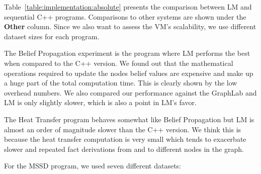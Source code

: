 Table~\ref{table:implementation:absolute} presents the comparison between LM and
sequential C++ programs. Comparisons to other systems are shown under the
\textbf{Other} column. Since we also want to assess the VM's scalability, we use
different dataset sizes for each program.

\begin{table}[ht]
   \begin{center}
      
   \end{center}


   \label{table:implementation:absolute}
\end{table}

The Belief Propagation experiment is the program where LM performs the best when
compared to the C++ version. We found out that the mathematical operations
required to update the nodes belief values are expensive and make up a huge part
of the total computation time. This is clearly shown by the low overhead
numbers. We also compared our performance against the GraphLab and LM is only
slightly slower, which is also a point in LM's favor.

The Heat Transfer program behaves somewhat like Belief Propagation but LM is
almost an order of magnitude slower than the C++ version. We think this is
because the heat transfer computation is very small which tends to exacerbate
slower and repeated fact derivations from and to different nodes in the graph.

For the MSSD program, we used seven different datasets:

